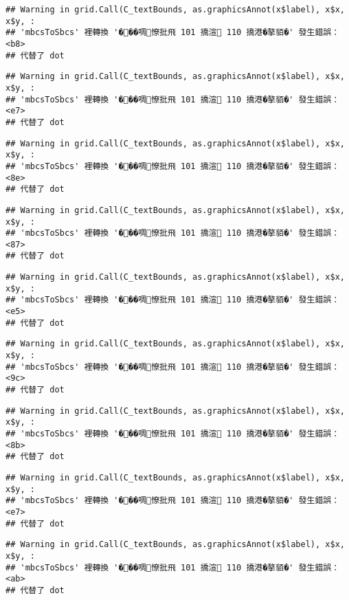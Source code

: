\documentclass[
]{article}
\begin{document}
\begin{verbatim}
## Warning in grid.Call(C_textBounds, as.graphicsAnnot(x$label), x$x, x$y, :
## 'mbcsToSbcs' 裡轉換 '���啁憭批飛 101 撟渲 110 撟港�摮貊�' 發生錯誤：<b8>
## 代替了 dot
\end{verbatim}

\begin{verbatim}
## Warning in grid.Call(C_textBounds, as.graphicsAnnot(x$label), x$x, x$y, :
## 'mbcsToSbcs' 裡轉換 '���啁憭批飛 101 撟渲 110 撟港�摮貊�' 發生錯誤：<e7>
## 代替了 dot
\end{verbatim}

\begin{verbatim}
## Warning in grid.Call(C_textBounds, as.graphicsAnnot(x$label), x$x, x$y, :
## 'mbcsToSbcs' 裡轉換 '���啁憭批飛 101 撟渲 110 撟港�摮貊�' 發生錯誤：<8e>
## 代替了 dot
\end{verbatim}

\begin{verbatim}
## Warning in grid.Call(C_textBounds, as.graphicsAnnot(x$label), x$x, x$y, :
## 'mbcsToSbcs' 裡轉換 '���啁憭批飛 101 撟渲 110 撟港�摮貊�' 發生錯誤：<87>
## 代替了 dot
\end{verbatim}

\begin{verbatim}
## Warning in grid.Call(C_textBounds, as.graphicsAnnot(x$label), x$x, x$y, :
## 'mbcsToSbcs' 裡轉換 '���啁憭批飛 101 撟渲 110 撟港�摮貊�' 發生錯誤：<e5>
## 代替了 dot
\end{verbatim}

\begin{verbatim}
## Warning in grid.Call(C_textBounds, as.graphicsAnnot(x$label), x$x, x$y, :
## 'mbcsToSbcs' 裡轉換 '���啁憭批飛 101 撟渲 110 撟港�摮貊�' 發生錯誤：<9c>
## 代替了 dot
\end{verbatim}

\begin{verbatim}
## Warning in grid.Call(C_textBounds, as.graphicsAnnot(x$label), x$x, x$y, :
## 'mbcsToSbcs' 裡轉換 '���啁憭批飛 101 撟渲 110 撟港�摮貊�' 發生錯誤：<8b>
## 代替了 dot
\end{verbatim}

\begin{verbatim}
## Warning in grid.Call(C_textBounds, as.graphicsAnnot(x$label), x$x, x$y, :
## 'mbcsToSbcs' 裡轉換 '���啁憭批飛 101 撟渲 110 撟港�摮貊�' 發生錯誤：<e7>
## 代替了 dot
\end{verbatim}

\begin{verbatim}
## Warning in grid.Call(C_textBounds, as.graphicsAnnot(x$label), x$x, x$y, :
## 'mbcsToSbcs' 裡轉換 '���啁憭批飛 101 撟渲 110 撟港�摮貊�' 發生錯誤：<ab>
## 代替了 dot
\end{verbatim}
\end{document}
